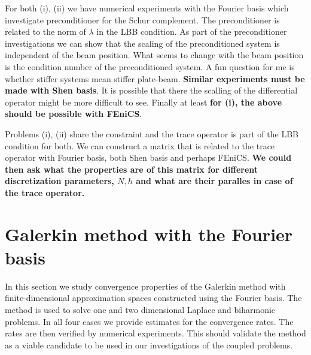 \documentclass[a4paper,10pt]{article}
\begin{document}
  For both (i), (ii) we have numerical experiments with the Fourier basis which
  investigate preconditioner for the Schur complement. The preconditioner is
  related to the norm of $\lambda$ in the LBB condition. As part of the
  preconditioner investigations we can show that the scaling of the preconditioned
  system is independent of the beam position. What seems to change
  with the beam position is the condition number of the preconditioned system.
  A fun question for me is whether stiffer systems mean stiffer plate-beam. 
  \textbf{Similar experiments must be made with Shen basis}. It is possible that
  there the scalling of the differential operator might be more difficult to see.
  Finally at least \textbf{for (i), the above should be possible with FEniCS}.

  Problems (i), (ii) share the constraint and the trace operator is part of the
  LBB condition for both. We can construct a matrix that is related to the trace
  operator with Fourier basis, both Shen basis and perhaps FEniCS. \textbf{We
  could then ask what the properties are of this matrix for different discretization
  parameters, $N, h$ and what are their paralles in case of the trace operator.}


  \section{Galerkin method with the Fourier basis}
  In this section we study convergence properties of the Galerkin method with 
  finite-dimensional approximation spaces constructed using the Fourier basis.
  The method is used to solve one and two dimensional Laplace and biharmonic 
  problems. In all four cases we provide estimates for the convergence rates.
  The rates are then verified by numerical experiments. This should validate
  the method as a viable candidate to be used in our investigations of the
  coupled problems.
\end{document}
